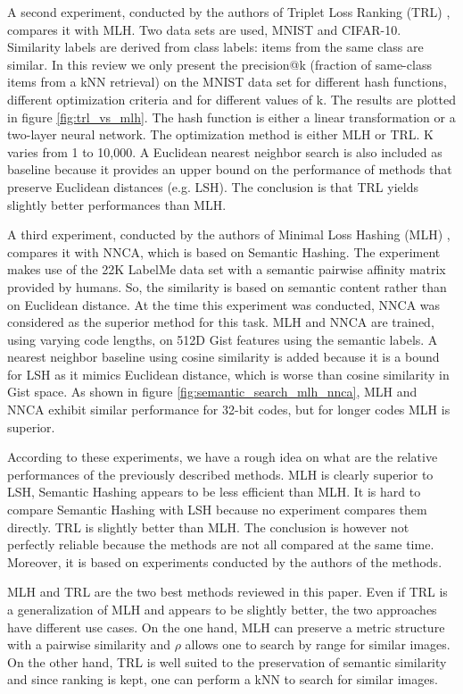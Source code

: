 A second experiment, conducted by the authors of Triplet Loss Ranking (TRL) \cite{norouzi2012hamming}, compares it with MLH. Two data sets are used, MNIST and CIFAR-10. Similarity labels are derived from class labels: items from the same class are similar. In this review we only present the precision@k (fraction of same-class items from a kNN retrieval) on the MNIST data set for different hash functions, different optimization criteria and for different values of k. The results are plotted in figure \ref{fig:trl_vs_mlh}. The hash function is either a linear transformation or a two-layer neural network. The optimization method is either MLH or TRL. K varies from 1 to 10,000. A Euclidean nearest neighbor search is also included as baseline because it provides an upper bound on the performance of methods that preserve Euclidean distances (e.g. LSH). The conclusion is that TRL yields slightly better performances than MLH.

A third experiment, conducted by the authors of Minimal Loss Hashing (MLH) \cite{norouzi2011minimal}, compares it with NNCA, which is based on Semantic Hashing. The experiment makes use of the 22K LabelMe data set with a semantic pairwise affinity matrix provided by humans. So, the similarity is based on semantic content rather than on Euclidean distance. At the time this experiment was conducted, NNCA was considered as the superior method for this task. MLH and NNCA are trained, using varying code lengths, on 512D Gist features using the semantic labels. A nearest neighbor baseline using cosine similarity is added because it is a bound for LSH as it mimics Euclidean distance, which is worse than cosine similarity in Gist space. As shown in figure \ref{fig:semantic_search_mlh_nnca}, MLH and NNCA exhibit similar performance for 32-bit codes, but for longer codes MLH is superior.

According to these experiments, we have a rough idea on what are the relative performances of the previously described methods. MLH is clearly superior to LSH, Semantic Hashing appears to be less efficient than MLH. It is hard to compare Semantic Hashing with LSH because no experiment compares them directly. TRL is slightly better than MLH. The conclusion is however not perfectly reliable because the methods are not all compared at the same time. Moreover, it is based on experiments conducted by the authors of the methods.

MLH and TRL are the two best methods reviewed in this paper. Even if TRL is a generalization of MLH and appears to be slightly better, the two approaches have different use cases. On the one hand, MLH can preserve a metric structure with a pairwise similarity and $\rho$ allows one to search by range for similar images. On the other hand, TRL is well suited to the preservation of semantic similarity and since ranking is kept, one can perform a kNN to search for similar images.

